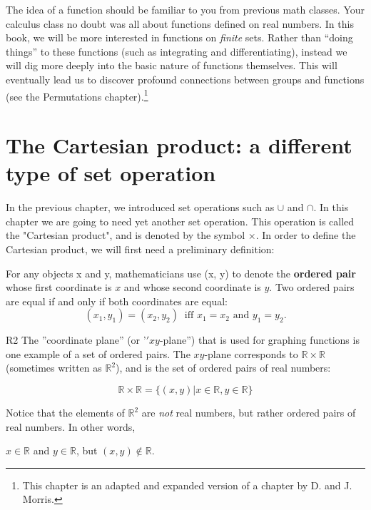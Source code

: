 
The idea of a function should be familiar to you from previous math classes. Your calculus class no doubt was all about functions defined on real numbers. In this book, we will be more interested in functions on \emph{finite} sets.  Rather than ``doing things'' to these functions (such as integrating and differentiating), instead we will dig more deeply into the basic nature of functions themselves. This will eventually lead us to discover profound connections between groups and functions (see the Permutations chapter).\footnote{This chapter  is an adapted and expanded version of a chapter by D. and J. Morris.} 

\section{The Cartesian product: a different type of set operation}

In the previous chapter, we introduced set operations such as $\cup$ and $\cap$.  In this chapter we are going to need yet another set operation. This operation is called the "Cartesian product", and is denoted by the symbol $\times$. In order to define the Cartesian product, we will first need a preliminary definition:

\begin{defn}
For any objects x and y, mathematicians use (x, y) to denote the \textbf{ordered pair} whose first coordinate is $x$ and whose second coordinate is $y$. Two ordered pairs are equal if and only if both coordinates are equal:  
\[
(x_1,y_1) = (x_2,y_2)~ \mbox{ iff }  x_1 = x_2 \mbox{ and } y_1 = y_2. \] 
\end{defn}

\begin{example}{R2}
The ''coordinate plane'' (or '$'xy$-plane'') that is used for graphing functions is one example of a set of ordered pairs. The $xy$-plane corresponds to ${\mathbb R} \times {\mathbb R}$  (sometimes written as  ${\mathbb R}^2$),  and is the set of ordered pairs of real numbers:

\[ 
{\mathbb R} \times {\mathbb R} = \{ (x, y) | x \in {\mathbb R}, y \in {\mathbb R} \} \]

Notice that the elements of ${\mathbb R}^2$ are  \emph{not} real numbers, but rather ordered pairs of real numbers.  In other words, 

\begin{center}
$x \in {\mathbb R}$ and $y \in  {\mathbb R}$, but $(x, y) \notin {\mathbb R}$.
\end{center}

\end{example}

